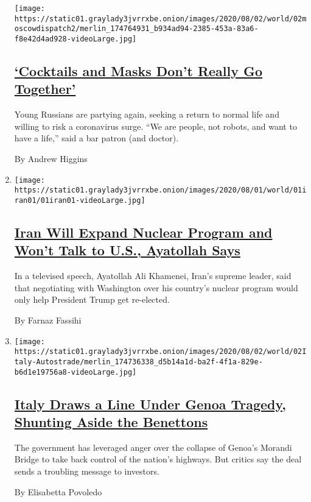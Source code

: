 \begin{enumerate}
  \texttt{[image: https://static01.graylady3jvrrxbe.onion/images/2020/08/02/world/02moscowdispatch2/merlin\_174764931\_b934ad94-2385-453a-83a6-f8e42d4ad928-videoLarge.jpg]}

  \hypertarget{cocktails-and-masks-dont-really-go-together}{%
  \subsection{\texorpdfstring{\href{/2020/08/01/world/europe/russia-moscow-coronavirus.html}{`Cocktails
  and Masks Don't Really Go
  Together'}}{`Cocktails and Masks Don't Really Go Together'}}\label{cocktails-and-masks-dont-really-go-together}}

  Young Russians are partying again, seeking a return to normal life and
  willing to risk a coronavirus surge. ``We are people, not robots, and
  want to have a life,'' said a bar patron (and doctor).

  By Andrew Higgins
\item
  \texttt{[image: https://static01.graylady3jvrrxbe.onion/images/2020/08/01/world/01iran01/01iran01-videoLarge.jpg]}

  \hypertarget{iran-will-expand-nuclear-program-and-wont-talk-to-us-ayatollah-says}{%
  \subsection{\texorpdfstring{\href{/2020/08/01/world/asia/iran-khamenei-us-sanctions.html}{Iran
  Will Expand Nuclear Program and Won't Talk to U.S., Ayatollah
  Says}}{Iran Will Expand Nuclear Program and Won't Talk to U.S., Ayatollah Says}}\label{iran-will-expand-nuclear-program-and-wont-talk-to-us-ayatollah-says}}

  In a televised speech, Ayatollah Ali Khamenei, Iran's supreme leader,
  said that negotiating with Washington over his country's nuclear
  program would only help President Trump get re-elected.

  By Farnaz Fassihi
\item
  \texttt{[image: https://static01.graylady3jvrrxbe.onion/images/2020/08/02/world/02Italy-Autostrade/merlin\_174736338\_d5b14a1d-ba2f-4f1a-829e-b6d1e19756a8-videoLarge.jpg]}

  \hypertarget{italy-draws-a-line-under-genoa-tragedy-shunting-aside-the-benettons}{%
  \subsection{\texorpdfstring{\href{/2020/08/01/world/europe/italy-genoa-bridge-collapse-benettons.html}{Italy
  Draws a Line Under Genoa Tragedy, Shunting Aside the
  Benettons}}{Italy Draws a Line Under Genoa Tragedy, Shunting Aside the Benettons}}\label{italy-draws-a-line-under-genoa-tragedy-shunting-aside-the-benettons}}

  The government has leveraged anger over the collapse of Genoa's
  Morandi Bridge to take back control of the nation's highways. But
  critics say the deal sends a troubling message to investors.

  By Elisabetta Povoledo
\end{enumerate}

